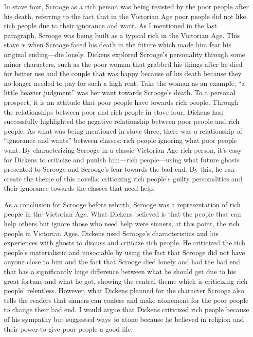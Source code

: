 \documentclass[11pt, oneside]{article}   	%
\begin{document}
In stave four, Scrooge as a rich person was being resisted by the poor people after his death, referring to the fact that in the Victorian Age poor people did not like rich people due to their ignorance and want. As I mentioned in the last paragraph, Scrooge was being built as a typical rich in the Victorian Age. This stave is when Scrooge faced his death in the future which made him fear his original ending---die lonely. Dickens explored Scrooge’s personality through some minor characters, such as the poor woman that grabbed his things after he died for better use and the couple that was happy because of his death because they no longer needed to pay for such a high rent. Take the woman as an example, “a little heavier judgment” was her want towards Scrooge’s death. To a personal prospect, it is an attitude that poor people have towards rich people. Through the relationships between poor and rich people in stave four, Dickens had successfully highlighted the negative relationship between poor people and rich people. As what was being mentioned in stave three, there was a relationship of “ignorance and wants” between classes: rich people ignoring what poor people want. By characterizing Scrooge in a classic Victorian Age rich person, it’s easy for Dickens to criticize and punish him---rich people---using what future ghosts presented to Scrooge and Scrooge’s fear towards the bad end. By this, he can create the theme of this novella: criticizing rich people’s guilty personalities and their ignorance towards the classes that need help. 


As a conclusion for Scrooge before rebirth, Scrooge was a representation of rich people in the Victorian Age. What Dickens believed is that the people that can help others but ignore those who need help were sinners, at this point, the rich people in Victorian Ages. Dickens used Scrooge’s characteristics and his experiences with ghosts to discuss and criticize rich people. He criticized the rich people’s materialistic and unsociable by using the fact that Scrooge did not have anyone close to him and the fact that Scrooge died lonely and had the bad end that has a significantly huge difference between what he should get due to his great fortune and what he got, showing the central theme which is criticizing rich people’ relentless. However, what Dickens planned for the character Scrooge also tells the readers that sinners can confess and make atonement for the poor people to change their bad end. I would argue that Dickens criticized rich people because of his sympathy but suggested ways to atone because he believed in religion and their power to give poor people a good life. 
\end{document}

